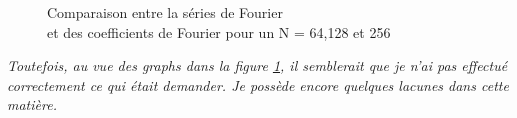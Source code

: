 \documentclass{article}
\begin{document}
\begin{figure}[H]
    \caption{Comparaison entre la séries de Fourier \\ et des coefficients de Fourier pour un N = 64,128 et 256}
    \label{fig0}
\end{figure}
\textit{Toutefois, au vue des graphs dans la figure \ref{fig0}, il semblerait que je n'ai pas effectué correctement ce qui était demander. Je possède encore quelques lacunes dans cette matière.} 

\newpage
\end{document}
